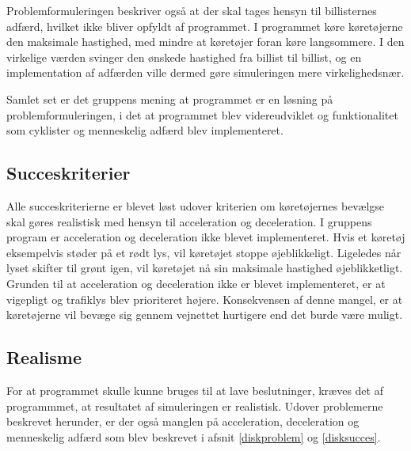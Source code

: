 \vspace{5mm}
Problemformuleringen beskriver også at der skal tages hensyn til billisternes adfærd, hvilket ikke bliver opfyldt af programmet. I programmet køre køretøjerne den maksimale hastighed, med mindre at køretøjer foran køre langsommere. I den virkelige værden svinger den ønskede hastighed fra billist til billist, og en implementation af adfærden ville dermed gøre simuleringen mere virkelighedsnær.

\vspace{5mm}
Samlet set er det gruppens mening at programmet er en løsning på problemformuleringen, i det at programmet blev videreudviklet og funktionalitet som cyklister og menneskelig adfærd blev implementeret.

\subsection*{Succeskriterier}\label{disksucces}
Alle succeskriterierne er blevet løst udover kriterien om køretøjernes bevælgse skal gøres realistisk med hensyn til acceleration og deceleration. I gruppens program er acceleration og deceleration ikke blevet implementeret. Hvis et køretøj eksempelvis støder på et rødt lys, vil køretøjet stoppe øjeblikkeligt. Ligeledes når lyset skifter til grønt igen, vil køretøjet nå sin maksimale hastighed øjeblikketligt. Grunden til at acceleration og deceleration ikke er blevet implementeret, er at vigepligt og trafiklys blev prioriteret højere. Konsekvensen af denne mangel, er at køretøjerne vil bevæge sig gennem vejnettet hurtigere end det burde være muligt.

\subsection*{Realisme}
For at programmet skulle kunne bruges til at lave beslutninger, kræves det af programmmet, at resultatet af simuleringen er realistisk. Udover problemerne beskrevet herunder, er der også manglen på acceleration, deceleration og menneskelig adfærd som blev beskrevet i afsnit \ref{diskproblem} og \ref{disksucces}.

